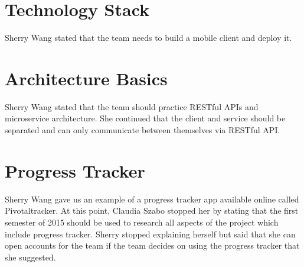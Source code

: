\documentclass[12pt]{article}
\begin{document}
\section*{Technology Stack}
Sherry Wang stated that the team needs to build a mobile client and deploy it.

\section*{Architecture Basics}
Sherry Wang stated that the team should practice RESTful APIs and microservice architecture. She continued that the client and service should be separated and can only communicate between themselves via RESTful API.

\section*{Progress Tracker}
Sherry Wang gave us an example of a progress tracker app available online called Pivotaltracker. At this point, Claudia Szabo stopped her by stating that the first semester of 2015 should be used to research all aspects of the project which include progress tracker. Sherry stopped explaining herself but said that she can open accounts for the team if the team decides on using the progress tracker that she suggested. 
 
\end{document}
